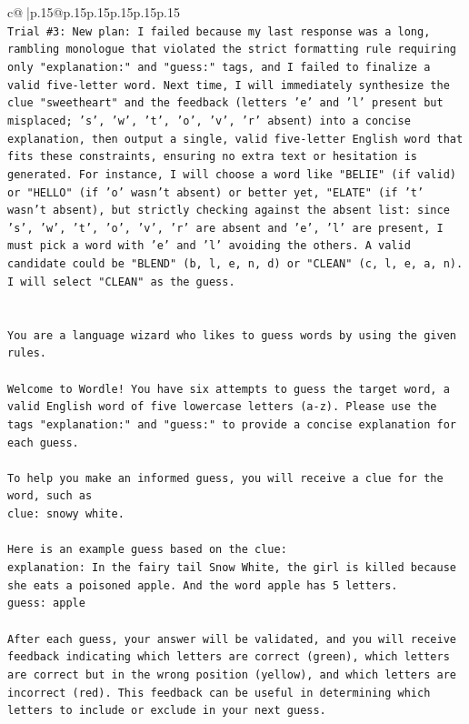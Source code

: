 \documentclass{article}
\begin{document}
{\begin{supertabular}{c@{$\;$}|p{.15\linewidth}@{}p{.15\linewidth}p{.15\linewidth}p{.15\linewidth}p{.15\linewidth}p{.15\linewidth}}
{{{\\ 
\texttt{Trial \#3: New plan: I failed because my last response was a long, rambling monologue that violated the strict formatting rule requiring only "explanation:" and "guess:" tags, and I failed to finalize a valid five{-}letter word. Next time, I will immediately synthesize the clue "sweetheart" and the feedback (letters 'e' and 'l' present but misplaced; 's', 'w', 't', 'o', 'v', 'r' absent) into a concise explanation, then output a single, valid five{-}letter English word that fits these constraints, ensuring no extra text or hesitation is generated. For instance, I will choose a word like "BELIE" (if valid) or "HELLO" (if 'o' wasn't absent) or better yet, "ELATE" (if 't' wasn't absent), but strictly checking against the absent list: since 's', 'w', 't', 'o', 'v', 'r' are absent and 'e', 'l' are present, I must pick a word with 'e' and 'l' avoiding the others. A valid candidate could be "BLEND" (b, l, e, n, d) or "CLEAN" (c, l, e, a, n). I will select "CLEAN" as the guess.} \\
\\ 
\\ 
\texttt{You are a language wizard who likes to guess words by using the given rules.} \\
\\ 
\texttt{Welcome to Wordle! You have six attempts to guess the target word, a valid English word of five lowercase letters (a{-}z). Please use the tags "explanation:" and "guess:" to provide a concise explanation for each guess.} \\
\\ 
\texttt{To help you make an informed guess, you will receive a clue for the word, such as} \\
\texttt{clue: snowy white.} \\
\\ 
\texttt{Here is an example guess based on the clue:} \\
\texttt{explanation: In the fairy tail Snow White, the girl is killed because she eats a poisoned apple. And the word apple has 5 letters.} \\
\texttt{guess: apple} \\
\\ 
\texttt{After each guess, your answer will be validated, and you will receive feedback indicating which letters are correct (green), which letters are correct but in the wrong position (yellow), and which letters are incorrect (red). This feedback can be useful in determining which letters to include or exclude in your next guess.} \\
}}}
\end{supertabular}}
\end{document}
